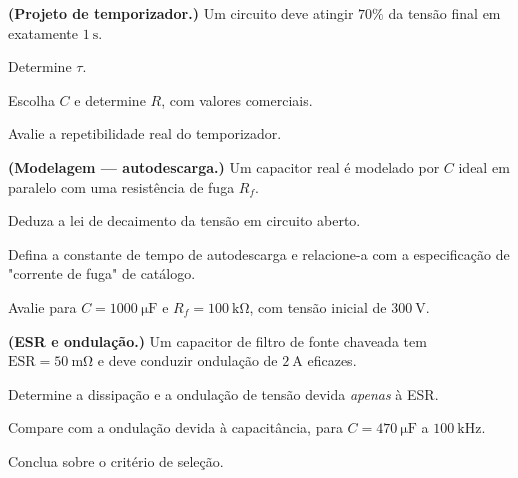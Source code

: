 \begin{questao}[4]{}

\textbf{(Projeto de temporizador.)} Um circuito deve atingir $70\%$ da tensão
final em exatamente $\SI{1}{\second}$.
\begin{itensq}
\item Determine $\tau$.
\item Escolha $C$ e determine $R$, com valores comerciais.
\item Avalie a repetibilidade real do temporizador.
\end{itensq}


\end{questao}
\begin{questao}[4]{}

\textbf{(Modelagem --- autodescarga.)} Um capacitor real é modelado por $C$
ideal em paralelo com uma resistência de fuga $R_f$.
\begin{itensq}
\item Deduza a lei de decaimento da tensão em circuito aberto.
\item Defina a constante de tempo de autodescarga e relacione-a com a
      especificação de "corrente de fuga" de catálogo.
\item Avalie para $C=\SI{1000}{\micro\farad}$ e
      $R_f=\SI{100}{\kilo\ohm}$, com tensão inicial de $\SI{300}{\volt}$.
\end{itensq}


\end{questao}
\begin{questao}[4]{}

\textbf{(ESR e ondulação.)} Um capacitor de filtro de fonte chaveada tem
$\mathrm{ESR}=\SI{50}{\milli\ohm}$ e deve conduzir ondulação de
$\SI{2}{\ampere}$ eficazes.
\begin{itensq}
\item Determine a dissipação e a ondulação de tensão devida \emph{apenas} à
      ESR.
\item Compare com a ondulação devida à capacitância, para
      $C=\SI{470}{\micro\farad}$ a $\SI{100}{\kilo\hertz}$.
\item Conclua sobre o critério de seleção.
\end{itensq}


\end{questao}
